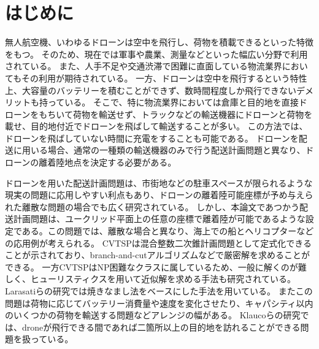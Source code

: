 \documentclass[11pt,a4paper,dvipdfmx,titlepage,uplatex]{jsarticle}
\title{{\large 令和5年度　学士論文}\\ \vskip\baselineskip
	時間制約付きcarrier vehicle routing問題に対する\\二次錐計画問題を用いた解法}
\author{東京工業大学　情報理工学院　数理・計算科学系\\
	学籍番号　19B31048\\
	脇田康平\\
	指導教員 山下 真 教授\\
}
\date{2023年2月27日}
\theoremstyle{mystyle}
\newcommand{\0}{\mathbf{0}}
\begin{document}
	
	\maketitle
	
	\tableofcontents
	\clearpage
	
	\section{はじめに}\label{sec:introduction}
	無人航空機、いわゆるドローンは空中を飛行し、荷物を積載できるといった特徴をもつ。
	そのため、現在では軍事や農業、測量などといった幅広い分野で利用されている。
	また、人手不足や交通渋滞で困難に直面している物流業界においてもその利用が期待されている。
	一方、ドローンは空中を飛行するという特性上、大容量のバッテリーを積むことができず、数時間程度しか飛行できないデメリットも持っている。
	そこで、特に物流業界においては倉庫と目的地を直接ドローンをもちいて荷物を輸送せず、トラックなどの輸送機器にドローンと荷物を載せ、目的地付近でドローンを飛ばして輸送することが多い。
	この方法では、ドローンを飛ばしていない時間に充電をすることも可能である。
	ドローンを配送に用いる場合、通常の一種類の輸送機器のみで行う配送計画問題と異なり、ドローンの離着陸地点を決定する必要がある。
	
	ドローンを用いた配送計画問題は、市街地などの駐車スペースが限られるような現実の問題に応用しやすい利点もあり、ドローンの離着陸可能座標が予め与えられた離散な問題の場合でも広く研究されている。\cite{luo2017two}
	しかし、本論文であつかう配送計画問題は、ユークリッド平面上の任意の座標で離着陸が可能であるような設定である。この問題では、離散な場合と異なり、海上での船とヘリコプターなどの応用例が考えられる。\cite{poikonen2020mothership}
	CVTSPは混合整数二次錐計画問題として定式化できることが示されており\cite{gambella2018vehicle}、branch-and-cutアルゴリズムなどで厳密解を求めることができる。\cite{tamke2021branch}
	一方CVTSPはNP困難なクラスに属しているため、一般に解くのが難しく、ヒューリスティクスを用いて近似解を求める手法も研究されている。Larasatiらの研究では焼きなまし法をベースにした手法を用いている。\cite{larasati2022integrated}
	またこの問題は荷物に応じてバッテリー消費量や速度を変化させたり、キャパシティ以内のいくつかの荷物を輸送する問題などアレンジの幅がある。
	Klaucoらの研究では、droneが飛行できる間であれば二箇所以上の目的地を訪れることができる問題を扱っている。\cite{klauvco2014mixed}
	
\end{document}

